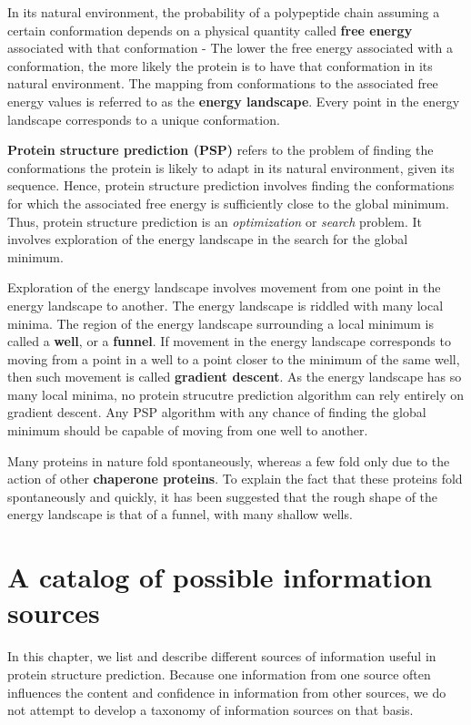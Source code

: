 \documentclass[10pt]{report}
\begin{document}
In its natural environment, the probability of a polypeptide chain assuming a certain conformation depends on a physical quantity called \textbf{free energy} associated with that conformation - The lower the free energy associated with a conformation, the more likely the protein is to have that conformation in its natural environment. The mapping from conformations to the associated free energy values is referred to as the \textbf{energy landscape}. Every point in the energy landscape corresponds to a unique conformation.

\textbf{Protein structure prediction (PSP)} refers to the problem of finding the conformations the protein is likely to adapt in its natural environment, given its sequence. Hence, protein structure prediction involves finding the conformations for which the associated free energy is sufficiently close to the global minimum. Thus, protein structure prediction is an \textit{optimization} or \textit{search} problem. It involves exploration of the energy landscape in the search for the global minimum.

Exploration of the energy landscape involves movement from one point in the energy landscape to another. The energy landscape is riddled with many local minima. The region of the energy landscape surrounding a local minimum is called a \textbf{well}, or a \textbf{funnel}. If movement in the energy landscape corresponds to moving from a point in a well to a point closer to the minimum of the same well, then such movement is called \textbf{gradient descent}. As the energy landscape has so many local minima, no protein strucutre prediction algorithm can rely entirely on gradient descent. Any PSP algorithm with any chance of finding the global minimum should be capable of moving from one well to another.

Many proteins in nature fold spontaneously, whereas a few fold only due to the action of other \textbf{chaperone proteins}. To explain the fact that these proteins fold spontaneously and quickly, it has been suggested that the rough shape of the energy landscape is that of a funnel, with many shallow wells.

\chapter{A catalog of possible information sources}

In this chapter, we list and describe different sources of information useful in protein structure prediction. Because one information from one source often influences the content and confidence in information from other sources, we do not attempt to develop a taxonomy of information sources on that basis.
\end{document}
